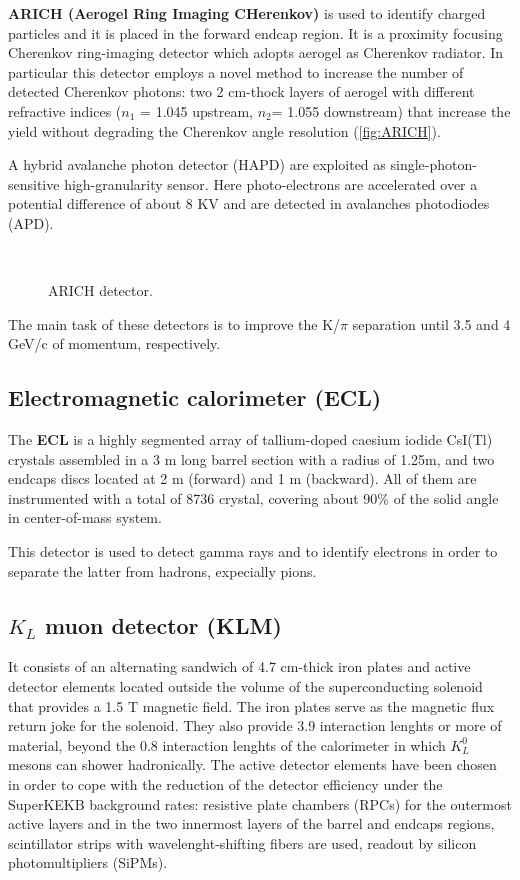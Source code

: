 \textbf{ARICH (Aerogel Ring Imaging CHerenkov)} is used to identify charged particles and it is placed in the forward endcap region. It is a proximity focusing Cherenkov ring-imaging detector which adopts aerogel as Cherenkov radiator. In particular this detector employs a novel method to increase the number of detected Cherenkov photons: two 2 cm-thock layers of aerogel with different refractive indices ($n_{1}$ = 1.045 upstream, $n_{2}$= 1.055 downstream) that increase the yield without degrading the Cherenkov angle resolution (\autoref{fig:ARICH}).

A hybrid avalanche photon detector (HAPD) are exploited as single-photon-sensitive high-granularity sensor. Here photo-electrons are accelerated over a potential difference of about 8 KV and are detected in avalanches photodiodes (APD).\\

\begin{figure}[h!]
\centering
{}\quad
{}\\
\caption{ARICH detector.}
\label{fig:ARICH}
\end{figure}

The main task of these detectors is to improve the K/$\pi$ separation until 3.5 and 4 GeV/c of momentum, respectively.

\subsection{Electromagnetic calorimeter (ECL)}

The \textbf{ECL} is a highly segmented array of tallium-doped caesium iodide CsI(Tl) crystals assembled in a 3 m long barrel section with a radius of 1.25m, and two endcaps discs located at 2 m (forward) and 1 m (backward). All of them are instrumented with a total of 8736 crystal, covering about 90\% of the solid angle in center-of-mass system. 

This detector is used to detect gamma rays and to identify electrons in order to separate the latter from hadrons, expecially pions.

\subsection{$K_{L}$ muon detector (KLM)}

It consists of an alternating sandwich of 4.7 cm-thick iron plates and active detector elements located outside the volume of the superconducting solenoid that provides a 1.5 T magnetic field. The iron plates serve as the magnetic flux return joke for the solenoid. They also provide 3.9 interaction lenghts or more of material, beyond the 0.8 interaction lenghts of the calorimeter in which $K_{L}^{0}$ mesons can shower hadronically. The active detector elements have been chosen in order to cope with the reduction of the detector efficiency under the SuperKEKB background rates: resistive plate chambers (RPCs) for the outermost active layers and in the two innermost layers of the barrel and endcaps regions, scintillator strips with wavelenght-shifting fibers are used, readout by silicon photomultipliers (SiPMs).\\

